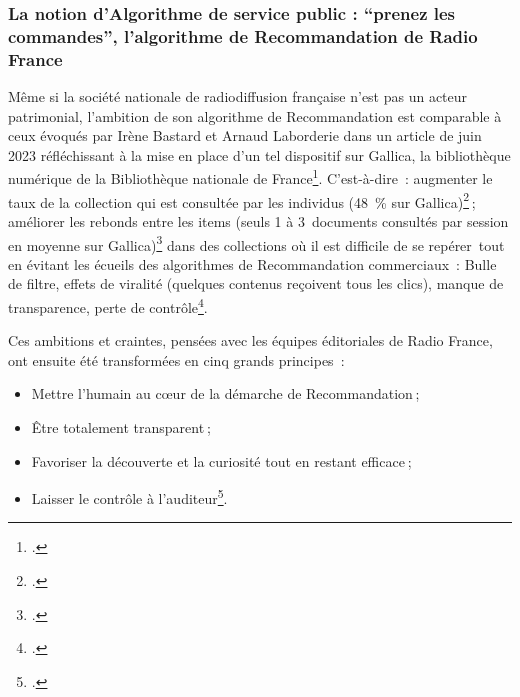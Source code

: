 \subsubsection{La notion d'Algorithme de service public : \enquote{prenez les commandes}, l'algorithme de Recommandation de Radio France}

Même si la société nationale de radiodiffusion française n’est pas un acteur patrimonial, l’ambition de son algorithme de Recommandation est comparable à ceux évoqués par Irène Bastard et Arnaud Laborderie dans un article de juin 2023 réfléchissant à la mise en place d’un tel dispositif sur Gallica, la bibliothèque numérique de la Bibliothèque nationale de France\footcite{bastard2023}. C’est-à-dire : augmenter le taux de la collection qui est consultée par les individus (48 \% sur Gallica)\footcite{bastard2023} ; améliorer les rebonds entre les items (seuls 1 à 3 documents consultés par session en moyenne sur Gallica)\footcite{bastard2023} dans des collections où il est difficile de se repérer tout en évitant les écueils des algorithmes de Recommandation commerciaux : Bulle de filtre, effets de viralité (quelques contenus reçoivent tous les clics), manque de transparence, perte de contrôle\footcite{2023b}.

Ces ambitions et craintes, pensées avec les équipes éditoriales de Radio France, ont ensuite été transformées en cinq grands principes : 
\begin{itemize}
	\item Mettre l’humain au cœur de la démarche de Recommandation ;
	\item Être totalement transparent ;
	\item Favoriser la découverte et la curiosité tout en restant efficace ;
	\item Laisser le contrôle à l’auditeur\footcite{2023b}.
\end{itemize}

